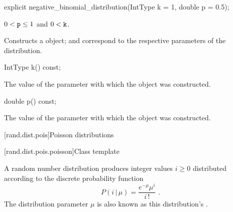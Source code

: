 %
\begin{itemdecl}
explicit negative_binomial_distribution(IntType k = 1, double p = 0.5);
\end{itemdecl}

\begin{itemdescr}
\pnum\requires
 $0 < \texttt{p} \leq 1$
 and $0 < \texttt{k} $.

\pnum\effects Constructs a  object;
  and 
 correspond to the respective parameters of the distribution.
\end{itemdescr}

%
\begin{itemdecl}
IntType k() const;
\end{itemdecl}

\begin{itemdescr}
\pnum\returns The value of the  parameter
 with which the object was constructed.
\end{itemdescr}

%
\begin{itemdecl}
double p() const;
\end{itemdecl}

\begin{itemdescr}
\pnum\returns The value of the  parameter
 with which the object was constructed.
\end{itemdescr}%
%
%



[rand.dist.pois]{Poisson distributions}%
%
%


[rand.dist.pois.poisson]{Class template }%
%
%

\pnum
A  random number distribution
produces integer values $i \geq 0$
distributed according to
the discrete probability function
%
%
\[ P(i\,|\,\mu) = \frac{e^{-\mu} \mu^{i}}{i\,!} \text{ .} \]
The distribution parameter $\mu$
is also known as this distribution's %
%
%
.

